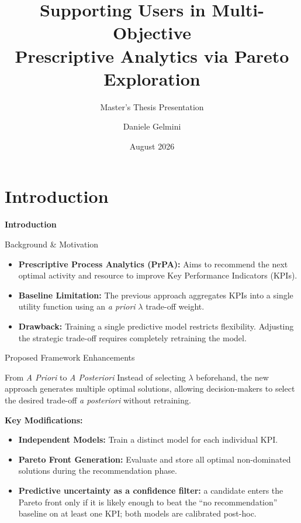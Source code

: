 \documentclass[aspectratio=169]{beamer} %
\title[Multi-Objective PrPA]{Supporting Users in Multi-Objective\\Prescriptive Analytics via Pareto Exploration}
\subtitle{Master's Thesis Presentation}
\author{Daniele Gelmini}
\institute[UniPD - Daniele Gelmini]{Mathematic's Department “Tullio Levi-Civita”\\Università degli Studi di Padova}
\date{August 2026}
\begin{document}
\frame{\titlepage}
\section{Introduction}
\begin{frame}[plain,c]
    \centering
    \color{Darkcandyapplered}
    \Huge\textbf{Introduction}
\end{frame}
\begin{frame}{Background \& Motivation}
    \begin{itemize}
        \item \textbf{Prescriptive Process Analytics (PrPA):} Aims to recommend the next optimal activity and resource to improve Key Performance Indicators (KPIs).
        \item \textbf{Baseline Limitation:} The previous approach aggregates KPIs into a single utility function using an \textit{a priori} $\lambda$ trade-off weight.
        \item \textbf{Drawback:} Training a single predictive model restricts flexibility. Adjusting the strategic trade-off requires completely retraining the model.
    \end{itemize}
\end{frame}

\begin{frame}{Proposed Framework Enhancements}
    \begin{block}{From \textit{A Priori} to \textit{A Posteriori}}
        Instead of selecting $\lambda$ beforehand, the new approach generates multiple optimal solutions, allowing decision-makers to select the desired trade-off \textit{a posteriori} without retraining.
    \end{block}
    \vspace{0.3cm}
    \textbf{Key Modifications:}
    \begin{itemize}
        \item \textbf{Independent Models:} Train a distinct model for each individual KPI.
        \item \textbf{Pareto Front Generation:} Evaluate and store all optimal non-dominated solutions during the recommendation phase.
        \item \textbf{Predictive uncertainty as a confidence filter:} a candidate enters the
          Pareto front only if it is likely enough to beat the ``no recommendation''
          baseline on at least one KPI; both models are calibrated post-hoc.
    \end{itemize}
\end{frame}
\end{document}

